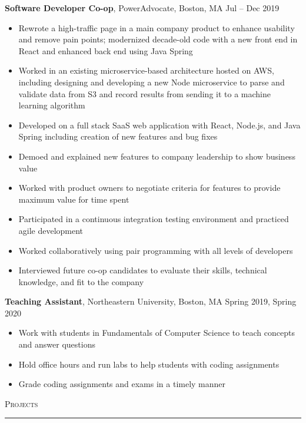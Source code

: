 \documentclass[11pt]{article}
\begin{document}
\begin{raggedright}
	\textbf{\large Software Developer Co-op}, PowerAdvocate, Boston, MA 
	\hfill Jul -- Dec 2019 \\
		\begin{itemize}
			\item Rewrote a high-traffic page in a main company product to enhance usability and remove pain points; modernized decade-old code with a new front end in React and enhanced back end using Java Spring
			\item Worked in an existing microservice-based architecture hosted on AWS, including designing and developing a new Node microservice to parse and validate data from S3 and record results from sending it to a machine learning algorithm
			\item Developed on a full stack SaaS web application with React, Node.js, and Java Spring including creation of new features and bug fixes
			\item Demoed and explained new features to company leadership to show business value
			\item Worked with product owners to negotiate criteria for features to provide maximum value for time spent
			\item Participated in a continuous integration testing environment and practiced agile development
			\item Worked collaboratively using pair programming with all levels of developers 
			\item Interviewed future co-op candidates to evaluate their skills, technical knowledge, and fit to the company
		\end{itemize}
	\vspace{0.1in}

	\textbf{\large Teaching Assistant}, Northeastern University, Boston, MA 
	\hfill Spring 2019, Spring 2020 \\
	\begin{itemize}
		\item Work with students in Fundamentals of Computer Science to teach concepts and answer questions
		\item Hold office hours and run labs to help students with coding assignments
		\item Grade coding assignments and exams in a timely manner
	\end{itemize}
	\vspace{0.1in}
	
	\textsc{\Large Projects} \\
	\vspace{-0.1in}
	\rule{\textwidth}{0.4pt} \\
	\vspace{0.05in}
	

\end{raggedright}
\end{document}
